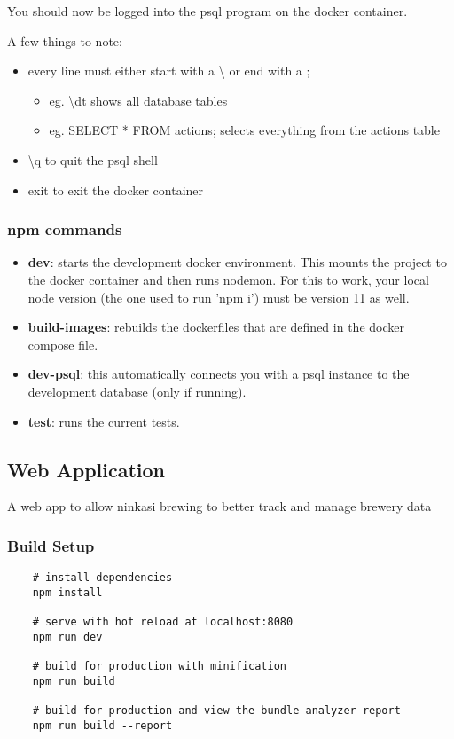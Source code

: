 \noindent
You should now be logged into the psql program on the docker container.

A few things to note:
\begin{itemize}
    \item every line must either start with a {\textbackslash} or end with a ;
    \begin{itemize}
        \item eg. \textbackslash dt shows all database tables
        \item eg. SELECT * FROM actions; selects everything from the actions table
    \end{itemize}
    \item \textbackslash q to quit the psql shell
    \item exit to exit the docker container
\end{itemize}

\subsubsection{npm commands}
\begin{itemize}
    \item {\bf dev}: starts the development docker environment. This mounts the project to the docker container and then runs nodemon. For this to work, your local node version (the one used to run 'npm i') must be version 11 as well.
    \item {\bf build-images}: rebuilds the dockerfiles that are defined in the docker compose file.
    \item {\bf dev-psql}: this automatically connects you with a psql instance to the development database (only if running).
    \item {\bf test}: runs the current tests.
\end{itemize}


\subsection{Web Application}
A web app to allow ninkasi brewing to better track and manage brewery data

\subsubsection{Build Setup}
\begin{verbatim}
    # install dependencies
    npm install
    
    # serve with hot reload at localhost:8080
    npm run dev
    
    # build for production with minification
    npm run build
    
    # build for production and view the bundle analyzer report
    npm run build --report
\end{verbatim}